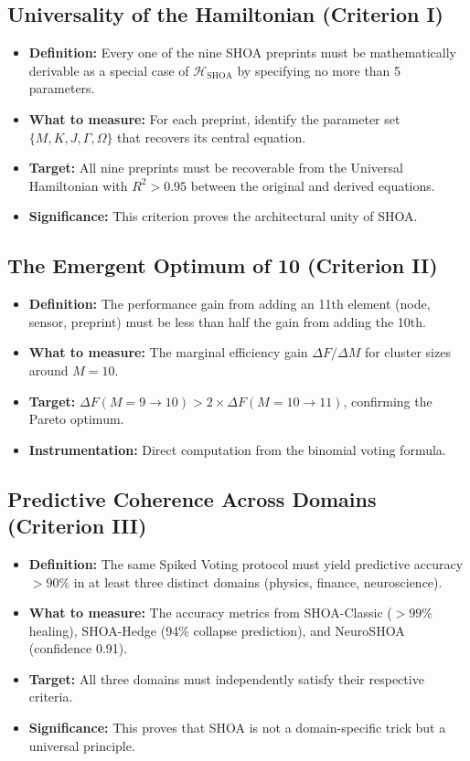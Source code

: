 \documentclass[12pt]{article}
\begin{document}
\subsection{Universality of the Hamiltonian (Criterion I)}
\begin{itemize}
    \item \textbf{Definition:} Every one of the nine SHOA preprints must be mathematically derivable as a special case of $\mathcal{H}_{\text{SHOA}}$ by specifying no more than 5 parameters.
    \item \textbf{What to measure:} For each preprint, identify the parameter set $\{M, K, J, \Gamma, \Omega\}$ that recovers its central equation.
    \item \textbf{Target:} All nine preprints must be recoverable from the Universal Hamiltonian with $R^2 > 0.95$ between the original and derived equations.
    \item \textbf{Significance:} This criterion proves the architectural unity of SHOA.
\end{itemize}

\subsection{The Emergent Optimum of 10 (Criterion II)}
\begin{itemize}
    \item \textbf{Definition:} The performance gain from adding an 11th element (node, sensor, preprint) must be less than half the gain from adding the 10th.
    \item \textbf{What to measure:} The marginal efficiency gain $\Delta F / \Delta M$ for cluster sizes around $M=10$.
    \item \textbf{Target:} $\Delta F(M=9 \to 10) > 2 \times \Delta F(M=10 \to 11)$, confirming the Pareto optimum.
    \item \textbf{Instrumentation:} Direct computation from the binomial voting formula.
\end{itemize}

\subsection{Predictive Coherence Across Domains (Criterion III)}
\begin{itemize}
    \item \textbf{Definition:} The same Spiked Voting protocol must yield predictive accuracy $> 90\%$ in at least three distinct domains (physics, finance, neuroscience).
    \item \textbf{What to measure:} The accuracy metrics from SHOA-Classic ($> 99\%$ healing), SHOA-Hedge (94\% collapse prediction), and NeuroSHOA (confidence 0.91).
    \item \textbf{Target:} All three domains must independently satisfy their respective criteria.
    \item \textbf{Significance:} This proves that SHOA is not a domain-specific trick but a universal principle.
\end{itemize}
\end{document}
